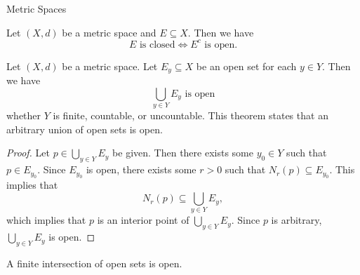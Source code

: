 \begin{section}{Metric Spaces}
\bigskip

\begin{corollary} \label{thm:ClosedSetComplementIsOpenSet}
    Let $(X, d)$ be a metric space and $E \subseteq X$. Then we have
    \[
    E \text{ is closed} \iff E^{c} \text{ is open.}
    \]
\end{corollary}

\bigskip

\begin{theorem} \label{thm:ArbitraryUnionOfOpenSetsIsOpen}
    Let $(X, d)$ be a metric space. Let $E_{y} \subseteq X$ be an open set for each $y \in Y$. Then we have
    \[
    \bigcup_{y \in Y} E_y \text{ is open}
    \]
    whether $Y$ is finite, countable, or uncountable. This theorem states that an arbitrary union of open sets is open.
\end{theorem}

\begin{proof}
    Let $p \in \displaystyle \bigcup_{y \in Y} E_{y}$ be given. Then there exists some $y_{0} \in Y$ such that $p \in E_{y_{0}}$.
    Since $E_{y_{0}}$ is open, there exists some $r > 0$ such that $N_{r}(p) \subseteq E_{y_{0}}$. This implies that
    \[
    N_{r}(p) \subseteq \bigcup_{y \in Y} E_y,
    \]
    which implies that $p$ is an interior point of $\displaystyle \bigcup_{y \in Y} E_y$.
    Since $p$ is arbitrary, $\displaystyle \bigcup_{y \in Y} E_y$ is open.
\end{proof}

\bigskip

\begin{theorem}
    A finite intersection of open sets is open.
\end{theorem}

\end{section}